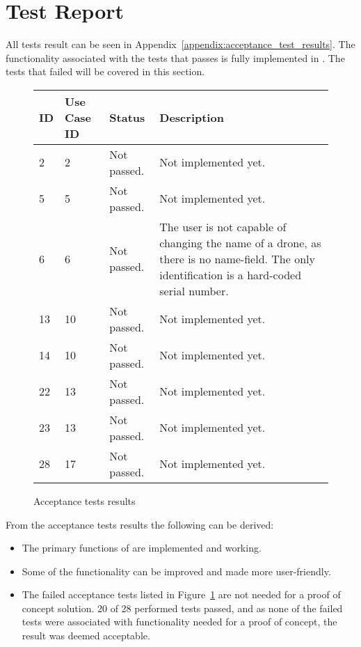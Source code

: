 \section{Test Report}
\label{sec:testing_report}

All tests result can be seen in Appendix~\ref{appendix:acceptance_test_results}.
The functionality associated with the tests that passes is fully implemented in \projectname{}.
The tests that failed will be covered in this section. \\


\begin{figure}[htb]
\begin{center}
\begin{tabular}{ | l | l | l | p{8cm} | }
  \hline
	\textbf{ID} & \textbf{Use Case ID} & \textbf{Status} & \textbf{Description} \\ \hline
	2 & 2 & Not passed. & Not implemented yet. \\ \hline
	5 & 5 & Not passed. & Not implemented yet. \\ \hline
	6 & 6 & Not passed. & The user is not capable of changing the name of a drone, as there is no name-field. The only identification is a hard-coded serial number. \\ \hline
	13 & 10 & Not passed. & Not implemented yet. \\ \hline
	14 & 10 & Not passed. & Not implemented yet. \\ \hline
	22 & 13 & Not passed. & Not implemented yet. \\ \hline
	23 & 13 & Not passed. & Not implemented yet. \\ \hline
	28 & 17 & Not passed. & Not implemented yet. \\ \hline
\end{tabular}
\caption{Acceptance tests results}
\label{tab:acceptance_tests_results_first_run}
\end{center}
\end{figure}

From the acceptance tests results the following can be derived:

\begin{itemize}
	\item The primary functions of \projectname{} are implemented and working. 
	\item Some of the functionality can be improved and made more user-friendly. 
	\item The failed acceptance tests listed in Figure~\ref{tab:acceptance_tests_results_first_run} are not needed for a proof of concept solution. 20 of 28 performed tests passed, and as none of the failed tests were associated with functionality needed for a proof of concept, the result was deemed acceptable.
\end{itemize}


